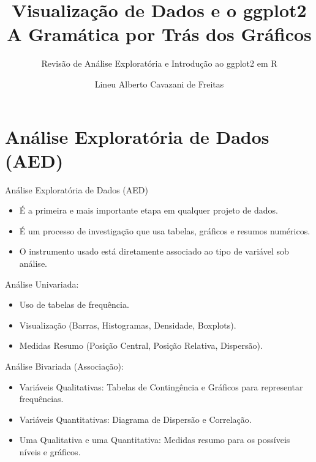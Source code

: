 \documentclass[
  ignorenonframetext,
  serif,
  professionalfont,
  usenames,
  dvipsnames,
  aspectratio = 169]{beamer}
\title{\textbf{Visualização de Dados e o ggplot2}\\
A Gramática por Trás dos Gráficos}
\subtitle{\hfill\break
Revisão de Análise Exploratória e Introdução ao ggplot2 em R}
\author{Lineu Alberto Cavazani de Freitas}
\date{}
\institute{\hfill\break
Pró-Reitoria de Planejamento e Dados (PROPLAD)\\
Coordenadoria de Estatística e Ciência de Dados (CECD)}
\def\beginAHalfColumn{\begin{minipage}{0.49\textwidth}}%
\def\endColumns{\end{minipage}}%
\begin{document}
\frame{\titlepage}

\section{Análise Exploratória de Dados
(AED)}\label{anuxe1lise-exploratuxf3ria-de-dados-aed}

\begin{frame}{Análise Exploratória de Dados (AED)}
\label{anuxe1lise-exploratuxf3ria-de-dados-aed-1}
\begin{itemize}
\item
  É a primeira e mais importante etapa em qualquer projeto de dados.
\item
  É um processo de investigação que usa tabelas, gráficos e resumos
  numéricos.
\item
  O instrumento usado está diretamente associado ao tipo de variável sob
  análise.
\end{itemize}

\beginAHalfColumn
\vspace{-0.7cm}

Análise Univariada:

\begin{itemize}
\item
  Uso de tabelas de frequência.
\item
  Visualização (Barras, Histogramas, Densidade, Boxplots).
\item
  Medidas Resumo (Posição Central, Posição Relativa, Dispersão).
\end{itemize}

\endColumns
\beginAHalfColumn

\vspace{0.7cm}

Análise Bivariada (Associação):

\begin{itemize}
\item
  Variáveis Qualitativas: Tabelas de Contingência e Gráficos para
  representar frequências.
\item
  Variáveis Quantitativas: Diagrama de Dispersão e Correlação.
\item
  Uma Qualitativa e uma Quantitativa: Medidas resumo para os possíveis
  níveis e gráficos.
\end{itemize}

\endColumns
\end{frame}
\end{document}
